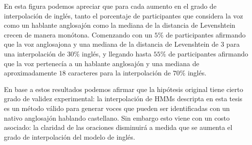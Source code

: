 En esta figura podemos apreciar que para cada aumento en el grado de interpolación de inglés, tanto el porcentaje de participantes que considera la voz como un hablante anglosajón como la mediana de la distancia de Levenshtein crecen de manera monótona. Comenzando con un $5\%$ de participantes afirmando que la voz anglosajona y una mediana de la distancia de Levenshtein de $3$ para una interpolación de $30\%$ inglés, y llegando hasta $55\%$ de participantes afirmando que la voz pertenecía a un hablante anglosajón y una mediana de aproximadamente $18$ caracteres para la interpolación de $70\%$ inglés.

En base a estos resultados podemos afirmar que la hipótesis original tiene cierto grado de validez experimental: la interpolación de HMMs descripta en esta tesis es un método válido para generar voces que pueden ser identificadas con un nativo anglosajón hablando castellano. Sin embargo esto viene con un costo asociado: la claridad de las oraciones disminuirá a medida que se aumenta el grado de interpolación del modelo de inglés.
